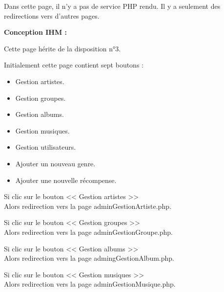 			\begin{paragraphe}
				Dans cette page, il n'y a pas de service PHP rendu. Il y a seulement des redirections vers d'autres pages.
			\end{paragraphe}

			\begin{paragraphe}
				\textbf{Conception IHM :}
			\end{paragraphe}

			\begin{paragraphe}
				Cette page hérite de la disposition n°3. \par
				Initialement cette page contient sept boutons :
				\begin{itemize}
					\item Gestion artistes.
					\item Gestion groupes.
					\item Gestion albums.
					\item Gestion musiques.
					\item Gestion utilisateurs.
					\item Ajouter un nouveau genre.
					\item Ajouter une nouvelle récompense.
				\end{itemize}
			\end{paragraphe}


			\begin{paragraphe}
				Si clic sur le bouton << Gestion artistes >> \\
				Alors redirection vers la page adminGestionArtiste.php.
			\end{paragraphe}

			\begin{paragraphe}
				Si clic sur le bouton << Gestion groupes >> \\
				Alors redirection vers la page adminGestionGroupe.php.
			\end{paragraphe}

			\begin{paragraphe}
				Si clic sur le bouton << Gestion albums >> \\
				Alors redirection vers la page admingGestionAlbum.php.
			\end{paragraphe}

			\begin{paragraphe}
				Si clic sur le bouton << Gestion musiques >> \\
				Alors redirection vers la page adminGestionMusique.php.
			\end{paragraphe}

